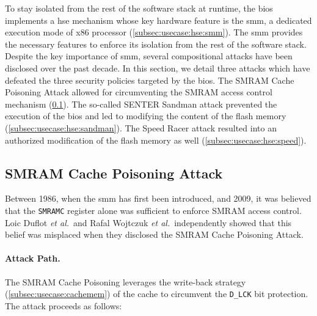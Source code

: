 To stay isolated from the rest of the software stack at runtime, the \ac{bios}
implements a \ac{hse} mechanism whose key hardware feature is the \ac{smm}, a
dedicated execution mode of x86 processor (\ref{subsec:usecase:hse:smm}).
%
The \ac{smm} provides the necessary features to enforce its isolation from the
rest of the software stack.
%
Despite the key importance of \ac{smm}, several compositional attacks have been
disclosed over the past decade.
%
In this section, we detail three attacks which have defeated the three security
policies targeted by the \ac{bios}.
%
The SMRAM Cache Poisoning Attack allowed for circumventing the SMRAM access
control mechanism (\ref{subsec:usecase:hse:smram}).
%
The so-called SENTER Sandman attack prevented the execution of the \ac{bios} and
led to modifying the content of the flash memory
(\ref{subsec:usecase:hse:sandman}).
%
The Speed Racer attack resulted into an authorized modification of the flash
memory as well (\ref{subsec:usecase:hse:speed}).

\subsection{SMRAM Cache Poisoning Attack}
\label{subsec:usecase:hse:smram}

Between 1986, when the \ac{smm} has first been introduced, and 2009, it was
believed that the \texttt{SMRAMC} register alone was sufficient to enforce SMRAM
access control.
%
Loic Duflot \emph{et al.}\,\cite{duflot2009smram} and Rafal Wojtczuk \emph{et
  al.}\,\cite{wojtczuk2009smram} independently showed that this belief was
misplaced when they disclosed the SMRAM Cache Poisoning Attack.

\paragraph{Attack Path.}
%
The SMRAM Cache Poisoning leverages the write-back strategy
(\ref{subsec:usecase:cachemem}) of the cache to circumvent the
\texttt{D\_LCK} bit protection.
%
The attack proceeds as follows:

